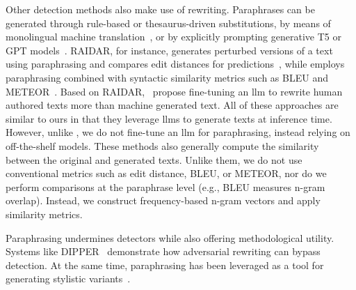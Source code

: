 Other detection methods also make use of rewriting. 
Paraphrases can be generated through rule-based or thesaurus-driven substitutions, by means of monolingual machine translation~\citep{zhou_paraphrase_2021}, or by explicitly prompting generative T5 or GPT models~\citep{kurt_pehlivanoglu_comparative_2024}.
RAIDAR, for instance, generates perturbed versions of a text using paraphrasing and compares edit distances for predictions~\citep{mao_raidar_2024}, while \mirrorMinds{} employs paraphrasing combined with syntactic similarity metrics such as BLEU and METEOR~\citep{baradia_mirror_2025}. 
Based on RAIDAR, \citet{li_learning_2025}\ propose fine-tuning an \ac{llm} to rewrite human authored texts more than machine generated text.
All of these approaches are similar to ours in that they leverage \acp{llm} to generate texts at inference time. 
However, unlike \citet{li_learning_2025}, we do not fine-tune an \ac{llm} for paraphrasing, instead relying on off-the-shelf models.
These methods also generally compute the similarity between the original and generated texts. 
Unlike them, we do not use conventional metrics such as edit distance, BLEU, or METEOR, nor do we perform comparisons at the paraphrase level (e.g., BLEU measures n-gram overlap). 
Instead, we construct frequency-based n-gram vectors and apply similarity metrics.

Paraphrasing undermines detectors while also offering methodological utility. 
Systems like DIPPER~\citep{Krishna_dipper_2023} demonstrate how adversarial rewriting can bypass detection. 
At the same time, paraphrasing has been leveraged as a tool for generating stylistic variants~\citep{mao_raidar_2024,baradia_mirror_2025}.
